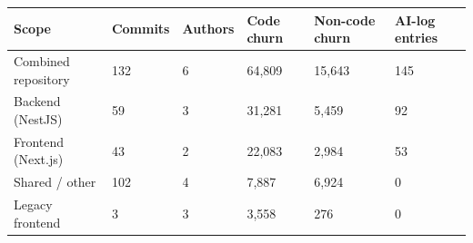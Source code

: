 \begin{tabular}{llllll}
\hline
Scope & Commits & Authors & Code churn & Non-code churn & AI-log entries \\
\hline
Combined repository & 132 & 6 & 64,809 & 15,643 & 145 \\
Backend (NestJS) & 59 & 3 & 31,281 & 5,459 & 92 \\
Frontend (Next.js) & 43 & 2 & 22,083 & 2,984 & 53 \\
Shared / other & 102 & 4 & 7,887 & 6,924 & 0 \\
Legacy frontend & 3 & 3 & 3,558 & 276 & 0 \\
\hline
\end{tabular}
